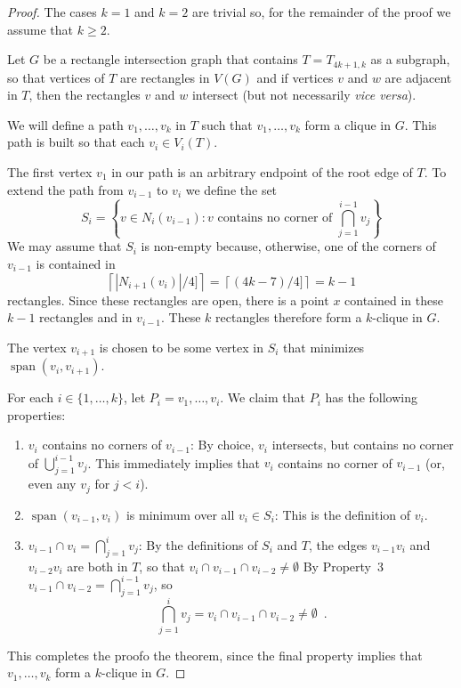 \documentclass[lotsofwhite]{patmorin}
\DeclareMathOperator{\spn}{span}
\begin{document}
\begin{proof}
  The cases $k=1$ and $k=2$ are trivial so, for the remainder of the proof
  we assume that $k\ge 2$.

  Let $G$ be a rectangle intersection graph that contains $T=T_{4k+1,k}$
  as a subgraph, so that vertices of $T$ are rectangles in $V(G)$ and
  if vertices $v$ and $w$ are adjacent in $T$, then the rectangles $v$
  and $w$ intersect (but not necessarily \emph{vice versa}).

  We will define a path $v_1,\ldots,v_k$ in $T$ such that $v_1,\ldots,v_k$
  form a clique in $G$. This path is built so that each $v_i\in V_i(T)$.

  The first vertex $v_1$ in our path is an arbitrary endpoint of the root
  edge of $T$.  To extend the path from $v_{i-1}$ to $v_{i}$ we define
  the set
  \[
     S_i = \left\{v\in N_{i}(v_{i-1}) : \text{$v$ contains no corner of
           $\bigcap_{j=1}^{i-1} v_j$}\right\}
  \]
  We may assume that $S_i$ is non-empty because, otherwise, one of the
  corners of $v_{i-1}$ is contained in
  \[  \left\lceil |N_{i+1}(v_i)|/4]\right\rceil 
      = \left\lceil(4k-7)/4]\right\rceil = k-1
  \]
  rectangles. Since these rectangles are open, there is a point $x$
  contained in these $k-1$ rectangles and in $v_{i-1}$.  These $k$
  rectangles therefore form a $k$-clique in $G$.   

  The vertex $v_{i+1}$ is chosen to be some vertex in $S_i$ that
  minimizes $\spn(v_{i},v_{i+1})$.

  For each $i\in\{1,\ldots,k\}$, let $P_i= v_1,\ldots,v_i$.  We claim that
  $P_i$ has the following properties:
  \begin{enumerate}
    \item $v_{i}$ contains no corners of $v_{i-1}$:
    By choice, $v_i$ intersects, but contains no corner of
    $\bigcup_{j=1}^{i-1} v_j$. This immediately implies that $v_i$
    contains no corner of $v_{i-1}$ (or, even any $v_j$ for $j<i$).

    \item $\spn(v_{i-1},v_i)$ is minimum over all $v_i \in S_i$:  This
    is the definition of $v_i$.
  
    \item $v_{i-1}\cap v_i = \bigcap_{j=1}^i v_j$:
    By the definitions of $S_i$ and $T$, the edges $v_{i-1}v_i$ and
    $v_{i-2}v_i$ are both in $T$, so that $v_i\cap v_{i-1}\cap v_{i-2}\neq \emptyset$
    By Property~3 $v_{i-1}\cap v_{i-2}=\bigcap_{j=1}^{i-1}
  v_j$, so
  \[
       \bigcap_{j=1}^i v_j = v_i\cap v_{i-1}\cap v_{i-2} \neq \emptyset \enspace .
  \]
  \end{enumerate}
  This completes the proofo the theorem, since the final property implies
  that $v_1,\ldots,v_k$ form a $k$-clique in $G$.
\end{proof}





\end{document}
